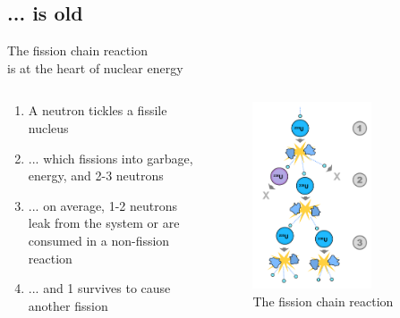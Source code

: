 \documentclass{beamer}
\begin{document}
    \subsection{... is old}

        \begin{frame}{The fission chain reaction \\ is at the heart of nuclear energy}

            \begin{columns}[T]

                \begin{column}{0.5\textwidth}
                    \begin{enumerate}
                        \item A neutron tickles a fissile nucleus
                        \pause
                        \item ... which fissions into garbage, energy, and 2-3 neutrons
                        \pause
                        \item ... on average, 1-2 neutrons leak from the system or are consumed in a non-fission reaction
                        \pause
                        \item ... and 1 survives to cause another fission
                    \end{enumerate}
                \end{column}

                \begin{column}{0.5\textwidth}
                    \begin{figure}
                        \centering
                        \includegraphics[width=0.7\textwidth]{./img/chainReaction.pdf}
                        \caption*{The fission chain reaction}
                    \end{figure}
                \end{column}


\end{columns}
\end{frame}
\end{document}
